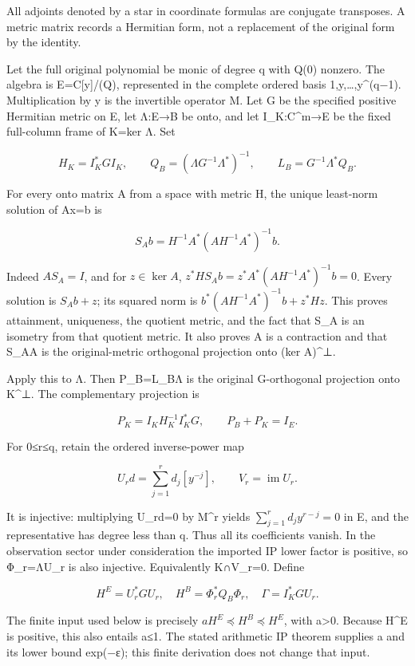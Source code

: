 All adjoints denoted by a star in coordinate formulas are conjugate transposes. A metric matrix records a Hermitian form, not a replacement of the original form by the identity.

Let the full original polynomial be monic of degree q with Q(0) nonzero. The algebra is E=C{[}y{]}/(Q), represented in the complete ordered basis 1,y,\ldots,y\^{}(q−1). Multiplication by y is the invertible operator M. Let G be the specified positive Hermitian metric on E, let Λ:E→B be onto, and let I\_K:C\^{}m→E be the fixed full-column frame of K=ker Λ. Set

\[
H_K=I_K^*GI_K,\qquad
Q_B=(\Lambda G^{-1}\Lambda^*)^{-1},\qquad
L_B=G^{-1}\Lambda^*Q_B.
\]

For every onto matrix A from a space with metric H, the unique least-norm solution of Ax=b is

\[
S_Ab=H^{-1}A^*(AH^{-1}A^*)^{-1}b.
\]

Indeed \(AS_A=I\), and for \(z\in\ker A\), \(z^*HS_Ab=z^*A^*(AH^{-1}A^*)^{-1}b=0\). Every solution is \(S_Ab+z\); its squared norm is \(b^*(AH^{-1}A^*)^{-1}b+z^*Hz\). This proves attainment, uniqueness, the quotient metric, and the fact that S\_A is an isometry from that quotient metric. It also proves A is a contraction and that S\_AA is the original-metric orthogonal projection onto (ker A)\^{}⊥.

Apply this to Λ. Then P\_B=L\_BΛ is the original G-orthogonal projection onto K\^{}⊥. The complementary projection is

\[
P_K=I_KH_K^{-1}I_K^*G,\qquad P_B+P_K=I_E.
\]

For 0≤r≤q, retain the ordered inverse-power map

\[
U_rd=\sum_{j=1}^r d_j[y^{-j}],\qquad V_r=\operatorname{im}U_r.
\]

It is injective: multiplying U\_rd=0 by M\^{}r yields \(\sum_{j=1}^rd_jy^{r-j}=0\) in E, and the representative has degree less than q. Thus all its coefficients vanish. In the observation sector under consideration the imported IP lower factor is positive, so Φ\_r=ΛU\_r is also injective. Equivalently K∩V\_r=0. Define

\[
H^E=U_r^*GU_r,\quad H^B=\Phi_r^*Q_B\Phi_r,\quad
\Gamma=I_K^*GU_r.
\]

The finite input used below is precisely \(aH^E\preceq H^B\preceq H^E\), with a\textgreater0. Because H\^{}E is positive, this also entails a≤1. The stated arithmetic IP theorem supplies a and its lower bound exp(−ε); this finite derivation does not change that input.

